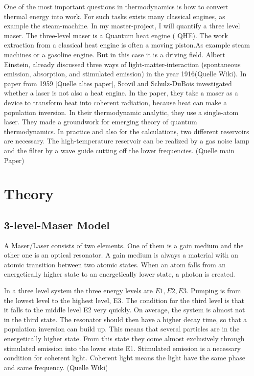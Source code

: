 \documentclass[12pt,a4paper]{article}
\begin{document}
One of the most important questions in thermodynamics is how to convert
thermal energy into work. For such tasks exists many classical engines, as
example the steam-machine. %
 In my master-project, I will quantify a three level maser.
The three-level maser is a Quantum heat engine ( QHE). The work
extraction from a classical heat engine is often a moving piston.As example steam machines or a gasoline engine. But in this case
it is a driving field. Albert Einstein, already discussed three ways of
light-matter-interaction (spontaneous emission, absorption, and stimulated
emission) in the year 1916(Quelle Wiki). In paper from 1959 [Quelle
altes paper], Scovil and Schulz-DuBois investigated whether a laser is not
also a heat engine. In the paper, they take a maser as a device to transform
heat into coherent radiation, because heat can make a population inversion.
In their thermodynamic analytic, they use a single-atom laser. They made a
groundwork for emerging theory of quantum thermodynamics. In practice and also for the calculations, two different reservoirs are necessary. The high-temperature reservoir can be
realized by a gas noise lamp and the filter by a wave guide cutting off the
lower frequencies. (Quelle main Paper)
\section{Theory}
\subsection{3-level-Maser Model}
A Maser/Laser consists of two elements. One of them is a gain medium and the other one is an optical resonator. A gain medium is always a material with an atomic transition between two atomic states. When an atom falls from an energetically higher state to an energetically lower state, a photon is created.

In a three level system the three energy levels are $E1,E2,E3$. Pumping is from the lowest level to the highest level, E3. The condition for the third level is that it falls to the middle level E2 very quickly. On average, the system is almost not in the third state. The resonator should then have a higher decay time, so that a population inversion can build up. This means that several particles are in the energetically higher state. From this state they come almost exclusively through stimulated emission into the lower state E1. Stimulated emission is a necessary condition for coherent light. Coherent light means the light have the same phase and same frequency. (Quelle Wiki)
\end{document}
